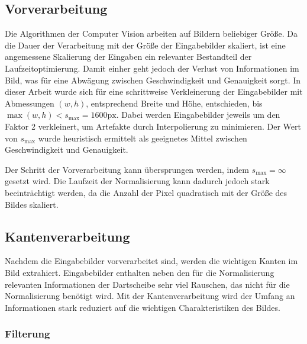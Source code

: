 \subsection{Vorverarbeitung}
\label{sec:vorverarbeitung}

Die Algorithmen der Computer Vision arbeiten auf Bildern beliebiger Größe. Da die Dauer der Verarbeitung mit der Größe der Eingabebilder skaliert, ist eine angemessene Skalierung der Eingaben ein relevanter Bestandteil der Laufzeitoptimierung. Damit einher geht jedoch der Verlust von Informationen im Bild, was für eine Abwägung zwischen Geschwindigkeit und Genauigkeit sorgt. In dieser Arbeit wurde sich für eine schrittweise Verkleinerung der Eingabebilder mit Abmessungen $(w, h)$, entsprechend Breite und Höhe, entschieden, bis $\max (w, h) < s_\text{max} = 1600\text{px}$. Dabei werden Eingabebilder jeweils um den Faktor 2 verkleinert, um Artefakte durch Interpolierung zu minimieren. Der Wert von $s_\text{max}$ wurde heuristisch ermittelt als geeignetes Mittel zwischen Geschwindigkeit und Genauigkeit.

Der Schritt der Vorverarbeitung kann übersprungen werden, indem $s_\text{max} = \infty$ gesetzt wird. Die Laufzeit der Normalisierung kann dadurch jedoch stark beeinträchtigt werden, da die Anzahl der Pixel quadratisch mit der Größe des Bildes skaliert.


\subsection{Kantenverarbeitung}
\label{sec:kanten}

Nachdem die Eingabebilder vorverarbeitet sind, werden die wichtigen Kanten im Bild extrahiert. Eingabebilder enthalten neben den für die Normalisierung relevanten Informationen der Dartscheibe sehr viel Rauschen, das nicht für die Normalisierung benötigt wird. Mit der Kantenverarbeitung wird der Umfang an Informationen stark reduziert auf die wichtigen Charakteristiken des Bildes.

\subsubsection{Filterung}
\label{sec:filterung}

